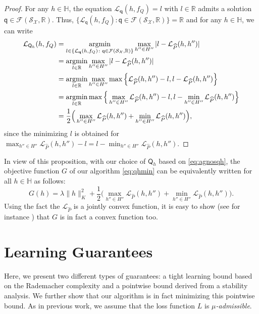 \documentclass[twoside,11pt]{article}
\def\Rset{\mathbb{R}}
\def\Hset{\mathbb{H}}
\DeclareMathOperator*{\argmin}{\rm argmin}
\newcommand{\h}{\widehat}
\newcommand{\set}[1]{\{#1\}}
\newcommand{\cF}{{\mathcal F}}
\newcommand{\cL}{{\mathcal L}}
\newcommand{\cS}{{\mathcal S}}
\newcommand{\cX}{{\mathcal X}}
\newcommand{\mat}[1]{{\mathbf #1}}
\newcommand{\1}{\mat{1}}
\newcommand{\bq}{\mat{q}}
\newcommand{\qq}{{\mathsf q}}
\newcommand{\QQ}{{\mathsf Q}}
\begin{document}
\begin{proof}
  For any $h \in \Hset$, the equation
$\cL_{\bq}(h, f_Q) =  l$ with $l \in \Rset$ admits a solution
$\qq \in \cF(\cS_\cX,  \Rset)$. Thus,
$\{\cL_{\qq}(h, f_Q) : \qq \in \cF(\cS_\cX, \Rset)\}  = \Rset$
and for any $h \in \Hset$, we can write
\begin{align*}
\cL_{\QQ_h}(h, f_Q)
& = \argmin_{\substack{l \in \set{\cL_{\bq}(h, f_Q)\colon \qq \in
      \cF(\cS_\cX, \Rset)}}} \max_{h'' \in H''}| l - \cL_{\h P}(h, h'')| \\
& = \argmin_{l \in \Rset} \max_{h'' \in H''}| l - \cL_{\h P}(h, h'') | \\
& = \argmin_{l \in \Rset} \max_{h''\in H''} \max \Big \{ \cL_{\h P}(h, h'')
  - l, l - \cL_{\h P}(h, h'') \Big \}\\
& = \argmin_{l \in \Rset} \max \Big \{ \max_{h''\in H''} \cL_{\h P}(h, h'')
  - l, l - \min_{h''\in H'' } \cL_{\h P}(h, h'') \Big \}\\
& = \frac{1}{2} \Big(\max_{h'' \in H''} \cL_{\h
    P}(h, h'') + \min_{h'' \in H''}\cL_{\h P}(h, h'') \Big),
\end{align*}
since the minimizing $l$ is obtained for
$\displaystyle \!\!\max_{h''\in H''} \cL_{\h P}(h,h'') - l
\!=\! l - \!\!\min_{h''\in H'' }\cL_{\h P}(h, h'')$.
\end{proof}

In view of this proposition, with our choice of $\QQ_h$ based on
\eqref{eq:agnosqh}, the objective function $G$ of our algorithm
\eqref{eq:qhmin} can be equivalently written for all $h \in \Hset$ as
follows:
\begin{equation}
\label{eq:optmaxmin}
G(h) =  \lambda\| h \|_K^2 + \frac{1}{2} \Big(\max_{h'' \in
  H''} \cL_{\h P}(h, h'') + \min_{h'' \in H''}\cL_{\h P}(h, h'')\Big).
\end{equation}
Using the fact the $\cL_{\h P}$ is a jointly convex function, it is
easy to show (see for instance \citealp{BoydVandenberghe2004}) that $G$
is in fact a convex function too.

\section{Learning Guarantees}
\label{sec:guarantees}

Here, we present two different types of guarantees: a tight learning bound
based on the Rademacher complexity and a pointwise bound derived from a
stability analysis. We further show that our algorithm is in fact
minimizing this pointwise bound. As in previous work, we assume that
the loss function $L$ is \emph{$\mu$-admissible}.
\end{document}
